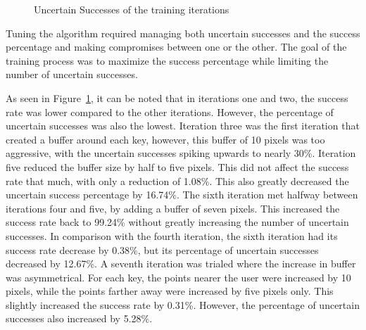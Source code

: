 \documentclass[preprint,12pt,authoryear]{elsarticle}
\begin{document}
\begin{figure}[H]
	\centering
	\caption{Uncertain Successes of the training iterations}
	\label{fig:rd-training-uncertain-successes-vs-success}
\end{figure}


Tuning the algorithm required managing both uncertain successes and the success
percentage and making compromises between one or the other. The goal of the
training process was to maximize the success percentage while limiting the
number of uncertain successes.

As seen in Figure~\ref{fig:rd-training-uncertain-successes-vs-success}, it can
be noted that in iterations one and two, the success rate was lower compared to
the other iterations. However, the percentage of uncertain successes was also
the lowest. Iteration three was the first iteration that created a buffer around
each key, however, this buffer of 10 pixels was too aggressive, with the
uncertain successes spiking upwards to nearly 30\%. Iteration five reduced the
buffer size by half to five pixels. This did not affect the success rate that
much, with only a reduction of 1.08\%. This also greatly decreased the uncertain
success percentage by 16.74\%. The sixth iteration met halfway between
iterations four and five, by adding a buffer of seven pixels. This increased the
success rate back to 99.24\% without greatly increasing the number of uncertain
successes. In comparison with the fourth iteration, the sixth iteration had its
success rate decrease by 0.38\%, but its percentage of uncertain successes
decreased by 12.67\%. A seventh iteration was trialed where the increase in
buffer was asymmetrical. For each key, the points nearer the user were increased
by 10 pixels, while the points farther away were increased by five pixels only.
This slightly increased the success rate by 0.31\%. However, the percentage of
uncertain successes also increased by 5.28\%.
\end{document}
